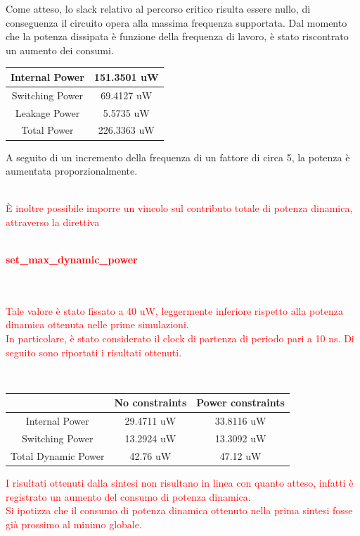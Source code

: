 \documentclass[11pt,  english, makeidx, a4paper, titlepage, oneside]{book}
\begin{document}
\vspace{0.3cm} 
Come atteso, lo slack relativo al percorso critico risulta essere nullo, di conseguenza il circuito opera alla massima frequenza supportata.
Dal momento che la potenza dissipata è funzione della frequenza di lavoro, è stato riscontrato un aumento dei consumi.
\\
\begin{center}
	\begin{tabular}{|c|c|}
	\hline
	Internal Power & 151.3501 uW \\
	\hline
	Switching Power & 69.4127 uW \\
	\hline
	Leakage Power & 5.5735 uW \\
	\hline
	Total Power & 226.3363 uW \\
	\hline
	\end{tabular}	
\end{center}
\vspace{0.3cm} 
A seguito di un incremento della frequenza di un fattore di circa 5, la potenza è aumentata proporzionalmente.
\\\\
\textcolor{red}{È inoltre possibile imporre un vincolo sul contributo totale di potenza dinamica, attraverso la direttiva
\\\\
\centerline{\textbf{set\_max\_dynamic\_power}}
\\\\
Tale valore è stato fissato a 40 uW, leggermente inferiore rispetto alla potenza dinamica ottenuta nelle prime simulazioni.
\\
In particolare, è stato considerato il clock di partenza di periodo pari a 10 ns.
Di seguito sono riportati i risultati ottenuti.}
\\
\begin{center}
	\begin{tabular}{|c|c|c|}
	\hline
	& No constraints & Power constraints\\
	\hline
	Internal Power & 29.4711 uW & 33.8116 uW \\
	\hline
	Switching Power & 13.2924 uW & 13.3092 uW \\
	\hline
	Total Dynamic Power & 42.76 uW & 47.12 uW \\
	\hline
	\end{tabular}	
\end{center}
\vspace{0.3cm}  
\textcolor{red}{I risultati ottenuti dalla sintesi non risultano in linea con quanto atteso, infatti è registrato un aumento del consumo di potenza dinamica.
\\
Si ipotizza che il consumo di potenza dinamica ottenuto nella prima sintesi fosse già prossimo al minimo globale.}
\end{document}
